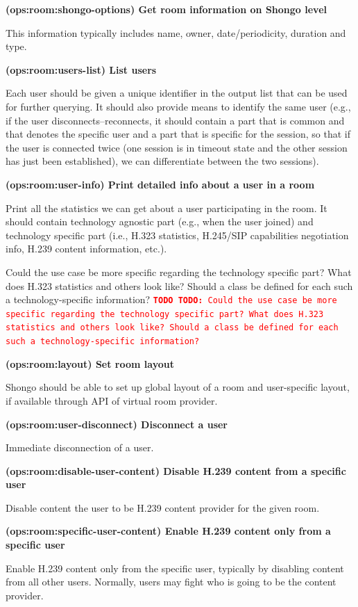 \documentclass[a4paper]{report}
\makeatletter
\newcounter{UCcounter}
\newenvironment{UseCases}%
	{\begin{list}{\textbf{UC-\arabic{UCcounter}}}{\@nmbrlisttrue\def\@listctr{UCcounter}}}%
	{\end{list}}
\newcommand{\UClabel}[1]{\label{UC:#1}}
\newcommand{\UseCase}[2]{\item\UClabel{#2} \textbf{(#2) #1}\\ \nopagebreak}
\newcommand{\TODO}[1]{%
\def\empty{}%
\def\prvniparametr{#1}%
\ifx\prvniparametr\empty%
\begingroup\tt\textcolor{red}{\noindent\textbf{TODO}}\endgroup
\else%
\begingroup\tt\textcolor{red}{\noindent\textbf{TODO:}\ #1}\endgroup
\fi%
}
\makeatother
\begin{document}
\begin{UseCases}

\UseCase{Get room information on Shongo level}{ops:room:shongo-options}

This information typically includes name, owner, date/periodicity, duration and type.


\UseCase{List users}{ops:room:users-list}

Each user should be given a unique identifier in the output list that can be
used for further querying. It should also provide means to identify the same
user (e.g., if the user disconnects--reconnects, it should contain a part that
is common and that denotes the specific user and a part that is specific for
the session, so that if the user is connected twice (one session is in timeout
state and the other session has just been established), we can differentiate
between the two sessions).

\UseCase{Print detailed info about a user in a room}{ops:room:user-info}

Print all the statistics we can get about a user participating in the room. It
should contain technology agnostic part (e.g., when the user joined) and
technology specific part (i.e., H.323 statistics, H.245/SIP capabilities
negotiation info, H.239 content information, etc.).

\TODO{Could the use case be more specific regarding the technology specific part? What does H.323 statistics and others look like? Should a class be defined for each such a technology-specific information?}

\UseCase{Set room layout}{ops:room:layout}

Shongo should be able to set up global layout of a room and user-specific
layout, if available through API of virtual room provider.

\UseCase{Disconnect a user}{ops:room:user-disconnect}

Immediate disconnection of a user.

\UseCase{Disable H.239 content from a specific user}{ops:room:disable-user-content}

Disable content the user to be H.239 content provider for the given room.

\UseCase{Enable H.239 content only from a specific user}{ops:room:specific-user-content}

Enable H.239 content only from the specific user, typically by disabling
content from all other users. Normally, users may fight who is going to be the
content provider.


\end{UseCases}
\end{document}
